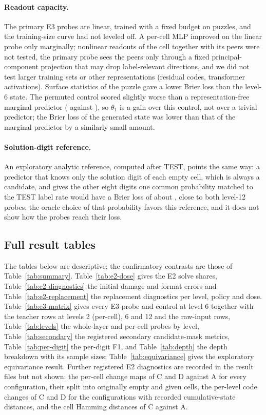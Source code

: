 \paragraph{Readout capacity.} The primary E3 probes are linear, trained with a fixed budget on  puzzles, and the training-size curve had not leveled off. A per-cell MLP improved on the linear probe only marginally; nonlinear readouts of the cell together with its peers were not tested, the primary probe sees the peers only through a fixed principal-component projection that may drop label-relevant directions, and we did not test larger training sets or other representations (residual codes, transformer activations). Surface statistics of the puzzle gave a lower Brier loss than the level-6 state. The permuted control scored slightly worse than a representation-free marginal predictor ( against ), so $\theta_1$ is a gain over this control, not over a trivial predictor; the Brier loss of the generated state was lower than that of the marginal predictor by a similarly small amount.

\paragraph{Solution-digit reference.} An exploratory analytic reference, computed after TEST, points the same way: a predictor that knows only the solution digit of each empty cell, which is always a candidate, and gives the other eight digits one common probability matched to the TEST label rate would have a Brier loss of about , close to both level-12 probes; the oracle choice of that probability favors this reference, and it does not show how the probes reach their loss.

\clearpage
\subsection{Full result tables}
\label{sec:appendix-tables}

The tables below are descriptive; the confirmatory contrasts are those of Table~\ref{tab:summary}. Table~\ref{tab:e2-dose} gives the E2 solve shares, Table~\ref{tab:e2-diagnostics} the initial damage and format errors and Table~\ref{tab:e2-replacement} the replacement diagnostics per level, policy and dose. Table~\ref{tab:e3-matrix} gives every E3 probe and control at level 6 together with the teacher rows at levels 2 (per-cell), 6 and 12 and the raw-input rows, Table~\ref{tab:levels} the whole-layer and per-cell probes by level, Table~\ref{tab:secondary} the registered secondary candidate-mask metrics, Table~\ref{tab:per-digit} the per-digit F1, and Table~\ref{tab:depth} the depth breakdown with its sample sizes; Table~\ref{tab:equivariance} gives the exploratory equivariance result. Further registered E2 diagnostics are recorded in the result files but not shown: the per-cell change maps of C and D against A for every configuration, their split into originally empty and given cells, the per-level code changes of C and D for the configurations with recorded cumulative-state distances, and the cell Hamming distances of C against A.

